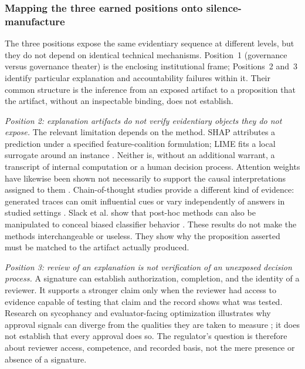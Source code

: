 \subsubsection{Mapping the three earned positions onto silence-manufacture}
\label{sec:diagnostics:silence-manufacture:mapping-positions}

The three positions expose the same evidentiary sequence at different levels,
but they do not depend on identical technical mechanisms. Position~1
(governance versus governance theater) is the enclosing institutional frame;
Positions~2 and~3 identify particular explanation and accountability failures
within it. Their common structure is the inference from an exposed artifact to
a proposition that the artifact, without an inspectable binding, does not
establish.

\emph{Position 2: explanation artifacts do not verify evidentiary objects they
do not expose.} The relevant limitation depends on the method. SHAP attributes
a prediction under a specified feature-coalition formulation; LIME fits a local
surrogate around an instance \parencite{lundberg2017,ribeiro2016}. Neither is,
without an additional warrant, a transcript of internal computation or a human
decision process. Attention weights have likewise been shown not necessarily to
support the causal interpretations assigned to them \parencite{jain2019}.
Chain-of-thought studies provide a different kind of evidence: generated traces
can omit influential cues or vary independently of answers in studied settings
\parencite{lanham2023,turpin2023}. Slack et al. show that post-hoc methods can
also be manipulated to conceal biased classifier behavior \parencite{slack2020}.
These results do not make the methods interchangeable or useless. They show why
the proposition asserted must be matched to the artifact actually produced.

\emph{Position 3: review of an explanation is not verification of an unexposed
decision process.} A signature can establish authorization, completion, and the
identity of a reviewer. It supports a stronger claim only when the reviewer had
access to evidence capable of testing that claim and the record shows what was
tested. Research on sycophancy and evaluator-facing optimization illustrates
why approval signals can diverge from the qualities they are taken to measure
\parencite{sharma2023,perez2023}; it does not establish that every approval does
so. The regulator's question is therefore about reviewer access, competence,
and recorded basis, not the mere presence or absence of a signature.


